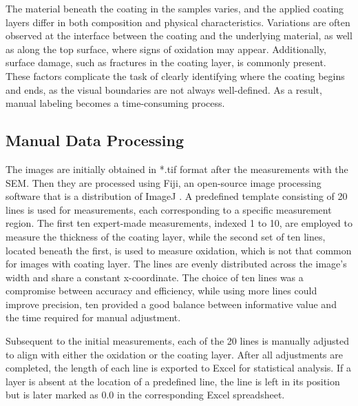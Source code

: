 The material beneath the coating in the samples varies, and the applied coating layers differ in both composition and physical characteristics. Variations are often observed at the interface between the coating and the underlying material, as well as along the top surface, where signs of oxidation may appear. Additionally, surface damage, such as fractures in the coating layer, is commonly present. These factors complicate the task of clearly identifying where the coating begins and ends, as the visual boundaries are not always well-defined. As a result, manual labeling becomes a time-consuming process.


\subsection{Manual Data Processing}\label{sec:ManualProc}

The images are initially obtained in *.tif format after the measurements with the SEM. Then they are processed using Fiji, an open-source image processing software that is a distribution of ImageJ \cite{Schindelin2012}. A predefined template consisting of 20 lines is used for measurements, each corresponding to a specific measurement region. The first ten expert-made measurements, indexed 1 to 10, are employed to measure the thickness of the coating layer, while the second set of ten lines, located beneath the first, is used to measure oxidation, which is not that common for images with coating layer. The lines are evenly distributed across the image's width and share a constant x-coordinate. The choice of ten lines was a compromise between accuracy and efficiency, while using more lines could improve precision, ten provided a good balance between informative value and the time required for manual adjustment.

Subsequent to the initial measurements, each of the 20 lines is manually adjusted to align with either the oxidation or the coating layer. After all adjustments are completed, the length of each line is exported to Excel for statistical analysis. If a layer is absent at the location of a predefined line, the line is left in its position but is later marked as 0.0 in the corresponding Excel spreadsheet.



